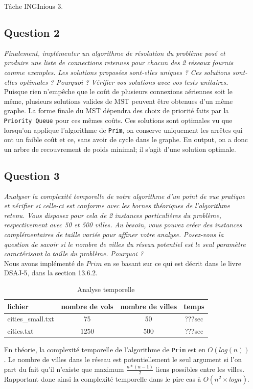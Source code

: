 \documentclass[11pt]{article}
\begin{document}
Tâche INGInious 3.

\subsection*{Question 2}
\textit{Finalement, implémenter un algorithme de résolution du problème posé et produire
une liste de connections retenues pour chacun des 2 réseaux fournis comme
exemples. Les solutions proposées sont-elles uniques ? Ces solutions sont-elles optimales ? Pourquoi ? Vérifier vos solutions avec vos tests unitaires.} \\

Puisque rien n'empêche que le coût de plusieurs connexions aériennes soit le même, plusieurs solutions valides de MST peuvent être obtenues d'un même graphe. La forme finale du MST dépendra des choix de priorité faits par la \verb+Priority Queue+ pour ces mêmes coûts.
Ces solutions sont optimales vu que lorsqu'on applique l'algorithme de \verb+Prim+, on conserve uniquement les arrêtes qui ont un faible coût et ce, sans avoir de cycle dans le graphe. En output, on a donc un arbre de recouvrement de poids minimal; il s'agit d'une solution optimale.\\

\subsection*{Question 3}
\textit{Analyser la complexité temporelle de votre algorithme d’un point de vue pratique
et vérifier si celle-ci est conforme avec les bornes théoriques de l’algorithme
retenu. Vous disposez pour cela de 2 instances particulières du problème,
respectivement avec 50 et 500 villes. Au besoin, vous pouvez créer des instances
complémentaires de taille variée pour affiner votre analyse. Posez-vous la question
de savoir si le nombre de villes du réseau potentiel est le seul paramètre
caractérisant la taille du problème. Pourquoi ?} \\

Nous avons implémenté de $Prim$ en se basant sur ce qui est décrit dans le livre DSAJ-5, dans la section 13.6.2.

\begin{table}[ht!]
\centering
\begin{tabular}{l|c|c|c}
fichier & nombre de vols & nombre de villes & temps \\
\hline
cities\_small.txt & 75 & 50 & ???sec \\
cities.txt & 1250 & 500 & ???sec \\
\end{tabular}
\caption{Analyse temporelle}
\end{table}
En théorie, la complexité temporelle de l'algorithme de \verb+Prim+ est en $O(log(n))$.
Le nombre de villes dans le réseau est potentiellement le seul argument si l'on part du fait qu'il n'existe que maximum $\frac{n*(n-1)}{2}$ liens possibles entre les villes. Rapportant donc ainsi la complexité temporelle dans le pire cas à $O(n^2 \times log n)$.
\end{document}
